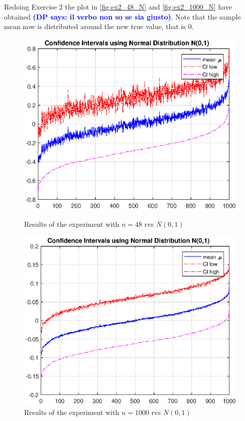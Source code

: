 \documentclass[11pt,a4paper]{article}
\newcommand{\DP}[1]{\textcolor{blue}{\textbf{(DP says: #1)}}}
\begin{document}
\vspace{2cm}

\section{}

Redoing Exercise 2 the plot in \autoref{fig:ex2_48_N} and \autoref{fig:ex2_1000_N} have obtained \DP{il verbo non so se sia giusto}.
Note that the sample mean now is distributed around the new true value, that is $0$.

\begin{figure}[ht]
	\centering
	\begin{minipage}{0.45\textwidth}
		\centering
		\includegraphics[width=\textwidth]{ex2_48_N}
		\caption{Results of the experiment with $n=48$ rvs $N(0,1)$}
		\label{fig:ex2_48_N}
	\end{minipage}
	\begin{minipage}{0.45\textwidth}
		\centering
		\includegraphics[width=\textwidth]{ex2_1000_N}
		\caption{Results of the experiment with $n=1000$ rvs $N(0,1)$}
		\label{fig:ex2_1000_N}
	\end{minipage}
\end{figure}
\end{document}
